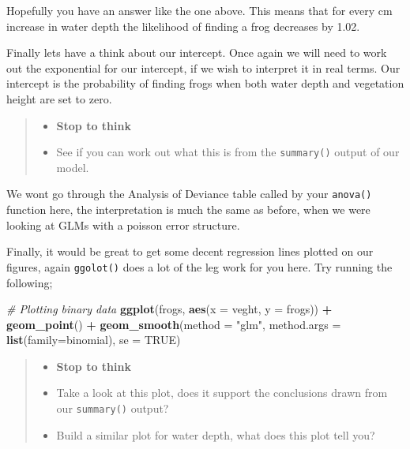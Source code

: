 \documentclass[
]{book}
\newenvironment{Shaded}{\begin{snugshade}}{\end{snugshade}}
\newcommand{\AttributeTok}[1]{\textcolor[rgb]{0.13,0.29,0.53}{#1}}
\newcommand{\CommentTok}[1]{\textcolor[rgb]{0.56,0.35,0.01}{\textit{#1}}}
\newcommand{\ConstantTok}[1]{\textcolor[rgb]{0.56,0.35,0.01}{#1}}
\newcommand{\FunctionTok}[1]{\textcolor[rgb]{0.13,0.29,0.53}{\textbf{#1}}}
\newcommand{\NormalTok}[1]{#1}
\newcommand{\SpecialCharTok}[1]{\textcolor[rgb]{0.81,0.36,0.00}{\textbf{#1}}}
\newcommand{\StringTok}[1]{\textcolor[rgb]{0.31,0.60,0.02}{#1}}
\providecommand{\tightlist}{%
  \setlength{\itemsep}{0pt}\setlength{\parskip}{0pt}}
\begin{document}
Hopefully you have an answer like the one above. This means that for every cm increase in water depth the likelihood of finding a frog decreases by 1.02.

Finally lets have a think about our intercept. Once again we will need to work out the exponential for our intercept, if we wish to interpret it in real terms. Our intercept is the probability of finding frogs when both water depth and vegetation height are set to zero.

\begin{quote}
\begin{itemize}
\tightlist
\item
  \textbf{Stop to think}
\item
  See if you can work out what this is from the \texttt{summary()} output of our model.
\end{itemize}
\end{quote}

We wont go through the Analysis of Deviance table called by your \texttt{anova()} function here, the interpretation is much the same as before, when we were looking at GLMs with a poisson error structure.

Finally, it would be great to get some decent regression lines plotted on our figures, again \texttt{ggolot()} does a lot of the leg work for you here. Try running the following;

\begin{Shaded}
\begin{Highlighting}[]
\CommentTok{\# Plotting binary data}
\FunctionTok{ggplot}\NormalTok{(frogs, }\FunctionTok{aes}\NormalTok{(}\AttributeTok{x =}\NormalTok{ veght, }\AttributeTok{y =}\NormalTok{ frogs)) }\SpecialCharTok{+} 
  \FunctionTok{geom\_point}\NormalTok{() }\SpecialCharTok{+}
  \FunctionTok{geom\_smooth}\NormalTok{(}\AttributeTok{method =} \StringTok{"glm"}\NormalTok{, }\AttributeTok{method.args =} \FunctionTok{list}\NormalTok{(}\AttributeTok{family=}\NormalTok{binomial), }\AttributeTok{se =} \ConstantTok{TRUE}\NormalTok{)}
\end{Highlighting}
\end{Shaded}

\begin{quote}
\begin{itemize}
\tightlist
\item
  \textbf{Stop to think}
\item
  Take a look at this plot, does it support the conclusions drawn from our \texttt{summary()} output?
\item
  Build a similar plot for water depth, what does this plot tell you?
\end{itemize}
\end{quote}
\end{document}
